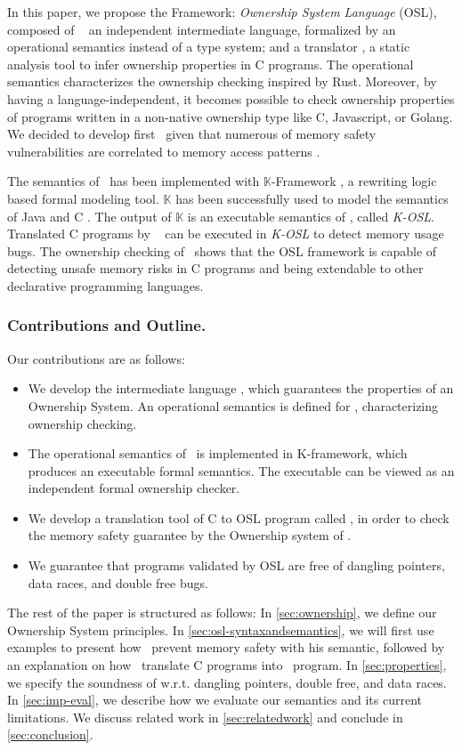 In this paper, we propose the Framework: {\em Ownership System Language} (OSL), composed of \oslos~ an independent intermediate language, formalized by an operational semantics instead of a type system; and a translator \oslt, a static analysis tool to infer ownership properties in C programs. The operational semantics characterizes the ownership checking inspired by Rust. Moreover, by having a language-independent, it becomes possible to check ownership properties of programs written in a non-native ownership type like C, Javascript, or Golang. We decided to develop first \oslt~given that numerous of memory safety vulnerabilities are correlated to memory access patterns \cite{CVE-mem-access}.

The semantics of \oslos~has been implemented with $\mathbb{K}$-Framework \cite{rosu-serbanuta-2010-jlap, lucanu-rosu-serbanuta-2012-wrla}, a rewriting logic based formal modeling tool. 
$\mathbb{K}$ has been successfully used to model the semantics of Java \cite{bogdanas-rosu-2015-popl} and C \cite{hathhorn-ellison-rosu-2015-pldi}.
The output of $\mathbb{K}$ is an executable semantics of \oslos, called \textit{K-OSL}. 
Translated C programs by \oslt~ can be executed in \textit{K-OSL} to detect memory usage bugs.
The ownership checking of \oslos~shows that the OSL framework is capable of detecting unsafe memory risks in C programs and being extendable to other declarative programming languages.\newline

\subsubsection{Contributions and Outline.} Our contributions are as follows:
\begin{itemize}
	\item We develop the intermediate language \oslos, which guarantees the properties of an Ownership System.
	An operational semantics is defined for \oslos, characterizing ownership checking.
	\item The  operational semantics of \oslos~is implemented in K-framework, which produces an executable formal semantics.
	The executable can be viewed as an independent formal ownership checker.
    \item We develop a translation tool of C to OSL program called \oslt, in order to check the memory safety guarantee by the Ownership system of \oslos. 
    \item We guarantee that programs validated by OSL are free of dangling pointers, data races, and double free bugs.
\end{itemize} 

The rest of the paper is structured as follows: In \autoref{sec:ownership}, we define our Ownership System principles.
 In \autoref{sec:osl-syntaxandsemantics}, we will first use examples to present how \oslos~prevent memory safety with
 his semantic, followed by an explanation on how \oslt~translate C programs into \oslos~program.
 In \autoref{sec:properties}, we specify the soundness of \oslos w.r.t. dangling pointers, double free, and data races.
 In \autoref{sec:imp-eval}, we describe how we evaluate our semantics and its current limitations.
 We discuss related work in \autoref{sec:relatedwork} and conclude in \autoref{sec:conclusion}.